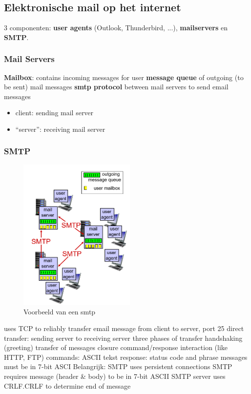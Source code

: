 \subsection{Elektronische mail op het internet}

3 componenten: \textbf{user agents} (Outlook, Thunderbird, ...), \textbf{mailservers} en \textbf{SMTP}.

\subsubsection{Mail Servers}

\textbf{Mailbox}: contains incoming messages for user
\textbf{message queue} of outgoing (to be sent) mail messages
\textbf{\acrshort{smtp} protocol} between mail servers to send email messages
\begin{itemize}
    \item client: sending mail server
    \item “server”: receiving mail server
\end{itemize}

\subsubsection{SMTP}

\begin{figure}[h]
\centering
\includegraphics[height=3in]{./img/imghfdst2/hdst2puntje8.png}
\caption{Voorbeeld van een smtp }
\label{fig:smtp}
\end{figure}


\bi
\itf uses TCP to reliably transfer email message from client to server, port 25
\itf direct transfer: sending server to receiving server
\itf three phases of transfer
    \bi
    \itf handshaking (greeting)
    \itf transfer of messages
    \itf closure
    \ei
\itf command/response interaction (like HTTP, FTP)
    \bi
    \itf commands: ASCII tekst
    \itf response: status code and phrase
    \ei
\itf messages must be in 7-bit ASCI
\ei
\noindent Belangrijk:
\bi
\itf SMTP uses persistent connections
\itf SMTP requires message (header \& body) to be in 7-bit ASCII
\itf SMTP server uses CRLF.CRLF to determine end of message
\ei


